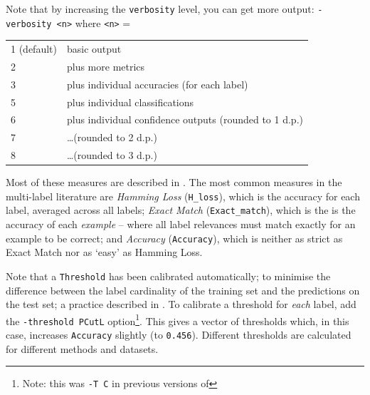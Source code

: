 \documentclass[11pt]{article}
\newcommand{\MEKA}{Meka}
\begin{document}
Note that by increasing the \texttt{verbosity} level, you can get more output: \texttt{-verbosity <n>} where \texttt{<n>} = 
\begin{center}
\begin{tabular}{ll}
	\hline
	1 (default) & basic output \\
	2           & plus more metrics \\
	3           & plus individual accuracies (for each label) \\
	5           & plus individual classifications \\
	6           & plus individual confidence outputs (rounded to 1 d.p.) \\
	7           & \ldots (rounded to 2 d.p.) \\
	8           & \ldots (rounded to 3 d.p.) \\
	\hline
\end{tabular}
\end{center}

Most of these measures are described in \cite{Thesis,ECC2,MMD}. The most common measures in the multi-label literature are \textit{Hamming Loss} (\texttt{H\_loss}), which is the accuracy for each label, averaged across all labels; \textit{Exact Match} (\texttt{Exact\_match}), which is the is the accuracy of each \emph{example} -- where all label relevances must match exactly for an example to be correct; and \textit{Accuracy} (\texttt{Accuracy}), which is neither as strict as Exact Match nor as `easy' as Hamming Loss.


Note that a \texttt{Threshold} has been calibrated automatically; to minimise the difference between the label cardinality of the training set and the predictions on the test set; a practice described in \cite{ECC2}. To calibrate a threshold for \emph{each} label, add the \texttt{-threshold PCutL} option\footnote{Note: this was \texttt{-T C} in previous versions of \framework{\MEKA}}. This gives a vector of thresholds which, in this case, increases \texttt{Accuracy} slightly (to \texttt{0.456}). Different thresholds are calculated for different methods and datasets.

\end{document}
